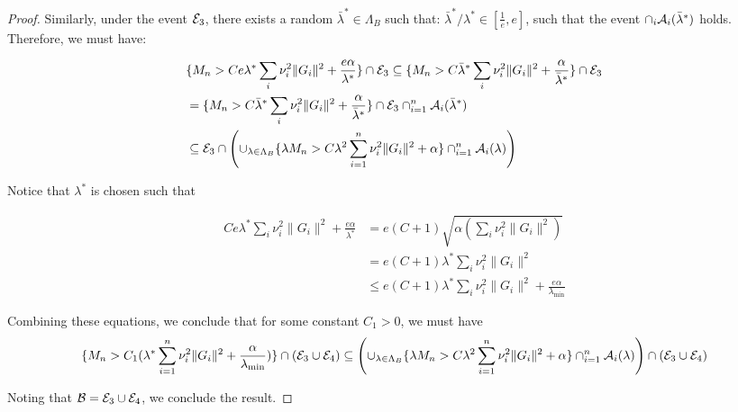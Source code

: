 \begin{proof}
Similarly, under the event $\mathcal{E}_3$, there exists a random $\bar{\lambda}^*\in \Lambda_B$ such that: $\bar{\lambda}^*/\lambda^* \in [\frac{1}{e},e]$, such that the event $\cap_i \mathcal{A}_i(\bar{\lambda}^*)$ holds. Therefore, we must have:

\begin{align}
&\{M_n > Ce\lambda^* \sum_i \nu_i^2\|G_i\|^2 + \frac{e\alpha}{\lambda^*}\}\cap \mathcal{E}_3 \subseteq \{M_n > C \bar{\lambda}^*\sum_i \nu_i^2 \|G_i\|^2 + \frac{\alpha}{\bar{\lambda}^*}\}\cap \mathcal{E}_3 \nonumber \\ &= \{M_n > C \bar{\lambda}^*\sum_i \nu_i^2 \|G_i\|^2 + \frac{\alpha}{\bar{\lambda}^*}\}\cap \mathcal{E}_3 \cap_{i=1}^n \mathcal{A}_i(\bar{\lambda}^*) \nonumber \\
&\subseteq \mathcal{E}_3\cap\left(\cup_{\lambda \in \Lambda_B}\{\lambda M_n > C \lambda^2\sum_{i=1}^{n}\nu_i^2\|G_i\|^2 + \alpha\}\cap_{i=1}^{n} \mathcal{A}_i(\lambda)\right)
\end{align}

Notice that $\lambda^*$ is chosen such that 

\begin{align}
Ce\lambda^* \sum_i \nu_i^2\|G_i\|^2 + \frac{e\alpha}{\lambda^*} &= e(C+1)\sqrt{\alpha(\sum_i \nu_i^2 \|G_i\|^2)} \nonumber \\
&= e(C+1)\lambda^* \sum_i \nu_i^2 \|G_i\|^2 \\
&\leq e(C+1)\lambda^* \sum_i \nu_i^2 \|G_i\|^2 + \frac{e \alpha}{\lambda_{\min}}
\end{align}


Combining these equations, we conclude that for some constant $C_1 > 0$, we must have
$$\{M_n > C_1(\lambda^*\sum_{i=1}^{n}\nu_i^2 \|G_i\|^2 + \frac{\alpha}{\lambda_{\min}}) \}\cap(\mathcal{E}_3\cup\mathcal{E}_4) \subseteq \left(\cup_{\lambda \in \Lambda_B}\{\lambda M_n > C \lambda^2\sum_{i=1}^{n}\nu_i^2\|G_i\|^2 + \alpha\}\cap_{i=1}^{n} \mathcal{A}_i(\lambda)\right)\cap(\mathcal{E}_3\cup \mathcal{E}_4) $$

Noting that $\mathcal{B} = \mathcal{E}_3\cup\mathcal{E}_4$, we conclude the result.
 


\end{proof}
